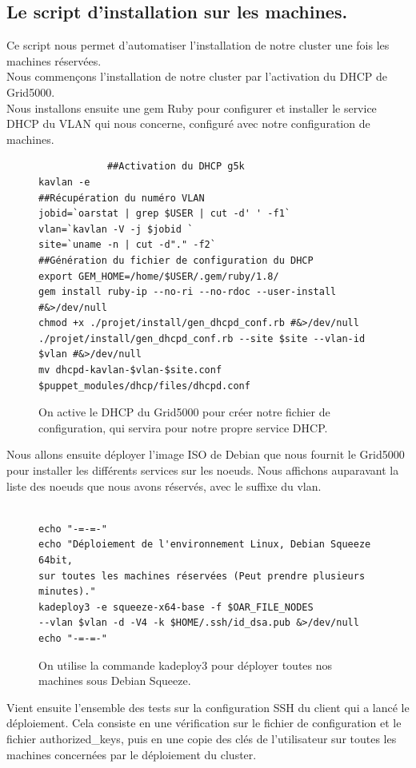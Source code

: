\documentclass[a4paper,10pt]{article}
\begin{document}
		\subsection{Le script d'installation sur les machines.}
		Ce script nous permet d'automatiser l'installation de notre cluster une fois les machines réservées.
		\\
	Nous commençons l'installation de notre cluster par l'activation du DHCP de Grid5000.
		\\
	Nous installons ensuite une gem Ruby pour configurer et installer le service DHCP du VLAN qui nous concerne, configuré avec notre configuration de machines.
		\begin{figure}[!h]
			\centering
			\begin{verbatim}
			##Activation du DHCP g5k
kavlan -e
##Récupération du numéro VLAN
jobid=`oarstat | grep $USER | cut -d' ' -f1`
vlan=`kavlan -V -j $jobid `
site=`uname -n | cut -d"." -f2`
##Génération du fichier de configuration du DHCP
export GEM_HOME=/home/$USER/.gem/ruby/1.8/
gem install ruby-ip --no-ri --no-rdoc --user-install #&>/dev/null
chmod +x ./projet/install/gen_dhcpd_conf.rb #&>/dev/null
./projet/install/gen_dhcpd_conf.rb --site $site --vlan-id $vlan #&>/dev/null
mv dhcpd-kavlan-$vlan-$site.conf $puppet_modules/dhcp/files/dhcpd.conf

			\end{verbatim}			
			\caption{On active le DHCP du Grid5000 pour créer notre fichier de configuration, qui servira pour notre propre service DHCP.}
		\end{figure}
		Nous allons ensuite déployer l'image ISO de Debian que nous fournit le Grid5000 pour installer les différents services sur les noeuds. Nous affichons auparavant la liste des noeuds que nous avons réservés, avec le suffixe du vlan.
		\begin{figure}[!h]
			\centering
			\begin{verbatim}		 
					 
echo "-=-=-"
echo "Déploiement de l'environnement Linux, Debian Squeeze 64bit,
sur toutes les machines réservées (Peut prendre plusieurs minutes)."
kadeploy3 -e squeeze-x64-base -f $OAR_FILE_NODES 
--vlan $vlan -d -V4 -k $HOME/.ssh/id_dsa.pub &>/dev/null
echo "-=-=-"		 
			\end{verbatim}
			\caption{On utilise la commande kadeploy3 pour déployer toutes nos machines sous Debian Squeeze.}
			\label{kadeploy3}
		\end{figure}
		
		Vient ensuite l'ensemble des tests sur la configuration SSH du client qui a lancé le déploiement. Cela consiste en une vérification sur le fichier de configuration et le fichier authorized\_keys, puis en une copie des clés de l'utilisateur sur toutes les machines concernées par le déploiement du cluster.
		
\end{document}
